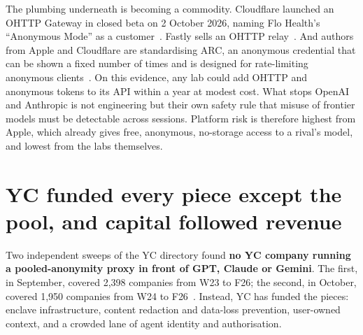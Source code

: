 \documentclass[10pt,a4paper]{article}
\begin{document}
The plumbing underneath is becoming a commodity. Cloudflare launched an OHTTP Gateway in closed beta on 2 October 2026, naming Flo Health's ``Anonymous Mode'' as a customer~\cite{cloudflare-blog-ohttp-gate}. Fastly sells an OHTTP relay~\cite{fastly-docs-oblivious-http}. And authors from Apple and Cloudflare are standardising ARC, an anonymous credential that can be shown a fixed number of times and is designed for rate-limiting anonymous clients~\cite{ietf-draft-privacy-pass}. On this evidence, any lab could add OHTTP and anonymous tokens to its API within a year at modest cost. What stops OpenAI and Anthropic is not engineering but their own safety rule that misuse of frontier models must be detectable across sessions. Platform risk is therefore highest from Apple, which already gives free, anonymous, no-storage access to a rival's model, and lowest from the labs themselves.

\section{YC funded every piece except the pool, and capital followed revenue}

Two independent sweeps of the YC directory found \textbf{no YC company running a pooled-anonymity proxy in front of GPT, Claude or Gemini}. The first, in September, covered 2,398 companies from W23 to F26; the second, in October, covered 1,950 companies from W24 to F26~\cite{yc-oss-yc-companies}. Instead, YC has funded the pieces: enclave infrastructure, content redaction and data-loss prevention, user-owned context, and a crowded lane of agent identity and authorisation.
\end{document}
